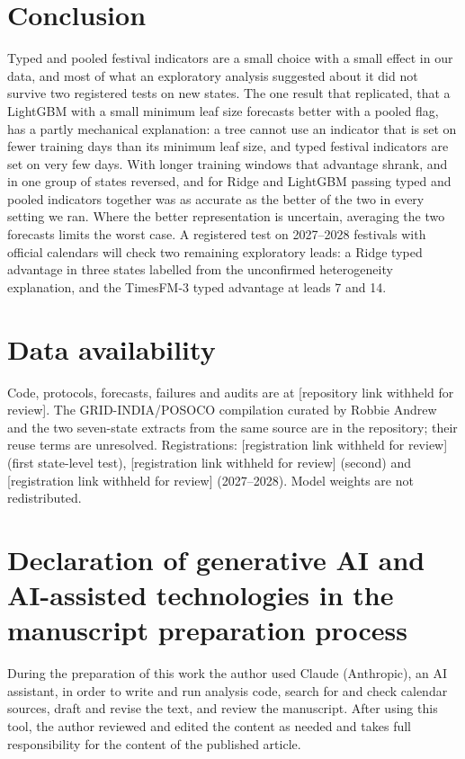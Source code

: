 \documentclass[review,12pt,authoryear]{elsarticle}
\begin{document}
\section{Conclusion}

Typed and pooled festival indicators are a small choice with a small effect in our data, and most of what an exploratory analysis suggested about it did not survive two registered tests on new states. The one result that replicated, that a LightGBM with a small minimum leaf size forecasts better with a pooled flag, has a partly mechanical explanation: a tree cannot use an indicator that is set on fewer training days than its minimum leaf size, and typed festival indicators are set on very few days. With longer training windows that advantage shrank, and in one group of states reversed, and for Ridge and LightGBM passing typed and pooled indicators together was as accurate as the better of the two in every setting we ran. Where the better representation is uncertain, averaging the two forecasts limits the worst case. A registered test on 2027--2028 festivals with official calendars will check two remaining exploratory leads: a Ridge typed advantage in three states labelled from the unconfirmed heterogeneity explanation, and the TimesFM-3 typed advantage at leads 7 and 14.

\section*{Data availability}
Code, protocols, forecasts, failures and audits are at {[}repository link withheld for review{]}. The GRID-INDIA/POSOCO compilation curated by Robbie Andrew and the two seven-state extracts from the same source are in the repository; their reuse terms are unresolved. Registrations: {[}registration link withheld for review{]} (first state-level test), {[}registration link withheld for review{]} (second) and {[}registration link withheld for review{]} (2027--2028). Model weights are not redistributed.

\section*{Declaration of generative AI and AI-assisted technologies in the manuscript preparation process}
During the preparation of this work the author used Claude (Anthropic), an AI assistant, in order to write and run analysis code, search for and check calendar sources, draft and revise the text, and review the manuscript. After using this tool, the author reviewed and edited the content as needed and takes full responsibility for the content of the published article.
\end{document}
